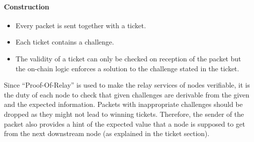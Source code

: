 \paragraph{Construction} 
\begin{itemize}
    \item Every packet is sent together with a ticket. 
    \item Each ticket contains a challenge.
    \item The validity of a ticket can only be checked on reception of the packet but the on-chain logic enforces a solution to the challenge stated in the ticket.
\end{itemize}
Since “Proof-Of-Relay” is used to make the relay services of nodes verifiable, it is the duty of each node to check that given challenges are derivable from the given and the expected information. 
Packets with inappropriate challenges should be dropped as they might not lead to winning tickets.
Therefore, the sender of the packet also provides a hint of the expected value that a node is supposed to get from the next downstream node (as explained in the ticket section). 










